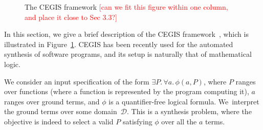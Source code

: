 \documentclass[twocolumn]{autart}    %
\renewcommand{\note}[1]{\textcolor{red}{[#1]}}
\begin{document}
\begin{figure}
\centering
{}
 \caption{The CEGIS framework\label{fig:CEGIS} \note{can we fit this figure within one column, and place it close to Sec 3.3?}}
\end{figure}

In this section, we give a brief description of the CEGIS framework~\cite{jha-icse10,
  DBLP:conf/asplos/Solar-LezamaTBSS06}, which is illustrated in Figure~\ref{fig:CEGIS}. 
  CEGIS has been recently used for the automated synthesis of software programs, 
  and its setup is naturally that of mathematical logic. 

We consider an input specification of the form $\exists P .\, \forall a.\, \phi(a, P)$, 
where $P$ ranges over functions (where a function is represented by the program computing it),
$a$ ranges over ground terms, 
and $\phi$ is a quantifier-free logical formula. 
We~interpret the ground terms over some domain~$\mathcal{D}$. 
This is a synthesis problem, where the objective is indeed to select a valid $P$ satisfying $\phi$ over all the $a$ terms. 
\end{document}
